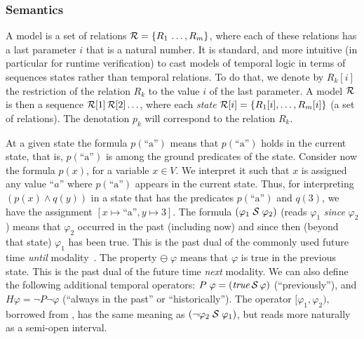 \subsubsection{Semantics} 

A model is a set of
 relations ${\cal R} = \{ R_1 \, \ldots , R_m \}$, where each of these relations has a last parameter $i$ that is a natural number. 
% 
It is standard, and more intuitive (in particular for runtime verification) to cast models of temporal logic in terms of sequences states rather than temporal relations. To do that,
 we denote by $R_k [ i ]$ the restriction of
 the relation $R_k$ to the value $i$ of the last parameter. A model ${\cal R}$ is then a sequence ${\cal R} [ 1 ]\, {\cal R} [ 2 ] \ldots$, where
 each {\em state} ${\cal R} [i] = \{ R_1 [i], \ldots , R_m [ i ] \}$  (a set of relations).
 The denotation $p_k$ will correspond to the relation $R_k$.


\iffalse
At a given state the formula
$p(\text{``a''})$ means that $p (\text{``a''} )$ holds
in the current state,
that is, $p (\text{``a''} )$ is among 
the ground predicates of the state.
Consider now the formula $p ( x )$, for a variable $x \in V$.
We interpret it such that $x$ is assigned any value ``$a$'' where
$p ( \text{``a''} )$ appears in the current state. 
Thus, for interpreting $(p ( x ) \wedge q ( y ))$ in a state that
has the predicates
$p ( \text{``a''} )$ and $q ( 3 )$,
we have the assignment $[ x \mapsto \text{``a''} , y \mapsto 3 ]$.
The formula $(\varphi_1\; {\cal S}\; \varphi_2)$ 
(reads $\varphi_1$ {\em since} $\varphi_2$)
means that $\varphi_2$ occurred in the past (including now)
and since then (beyond that state) $\varphi_1$ has been true. This is the 
past dual of the commonly used %
future time  {\em until} modality~\cite{MP}. 
The property $\ominus \; \varphi$ means that $\varphi$ is true 
in the previous state.
This is the past dual of the %
future time {\em next} modality.
We can also define the following additional temporal operators:
$P \; \varphi = (\mathit{true} \, {\cal S} \, \varphi)$ (``previously''),
and $H \varphi = \neg P \neg \varphi$ (``always in the past'' or ``historically'').
The operator $[\varphi_1,\varphi_2)$, borrowed from \cite{MaC}, 
has the same meaning as $(\neg \varphi_2\; {\cal S}\; \varphi_1)$, but reads more naturally as
a semi-open interval. 



